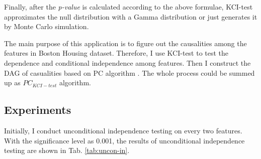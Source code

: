 \documentclass[12pt,a4paper]{article}
\theoremstyle{definition}
\begin{document}
\vspace{0.008\linewidth}
Finally, after the \textit{p-value} is calculated according to the above formulae, KCI-test approximates the null distribution with a Gamma distribution or just generates it by Monte Carlo simulation.

\vspace{0.008\linewidth}
The main purpose of this application is to figure out the causalities among the features in Boston Housing dataset. Therefore, I use KCI-test to test the dependence and conditional independence among features. Then I construct the DAG of casualities based on PC algorithm \cite{pc-alg}. The whole process could be summed up as $PC_{KCI-test}$ algorithm.

\subsection{Experiments}

Initially, I conduct unconditional independence testing on every two features. With the significance level as 0.001, the results of unconditional independence testing are shown in Tab. \ref{tab:uncon-in}.
\end{document}
